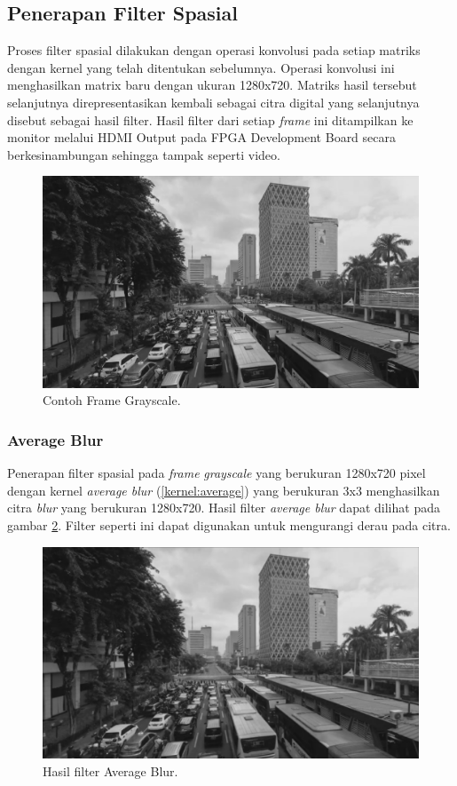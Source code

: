 \subsection{Penerapan Filter Spasial}

Proses filter spasial dilakukan dengan operasi konvolusi pada setiap matriks dengan kernel yang telah ditentukan sebelumnya. Operasi konvolusi ini menghasilkan matrix baru dengan ukuran 1280x720. Matriks hasil tersebut selanjutnya direpresentasikan kembali sebagai citra digital yang selanjutnya disebut sebagai hasil filter. Hasil filter dari setiap \textit{frame} ini ditampilkan ke monitor melalui HDMI Output pada FPGA Development Board secara berkesinambungan sehingga tampak seperti video.

\begin{figure}[H]
    \includegraphics[width=0.8\linewidth, center]{images/output-image/input1-grayscale.png}
    \caption{Contoh Frame Grayscale.}
    \label{fig:input-grayscale}
\end{figure}


\subsubsection{Average Blur}
Penerapan filter spasial pada \textit{frame} \textit{grayscale} yang berukuran 1280x720 pixel dengan kernel \textit{average blur} (\ref{kernel:average}) yang berukuran 3x3 menghasilkan citra 
\textit{blur} yang berukuran 1280x720. Hasil filter \textit{average blur} dapat dilihat pada gambar \ref{fig:output-averageblur}. Filter seperti ini dapat digunakan untuk mengurangi derau pada citra.
\begin{figure}
    \includegraphics[width=0.8\linewidth, center]{images/output-image/input1-averageblur.png}
    \caption{Hasil filter Average Blur.}
    \label{fig:output-averageblur}
\end{figure}

